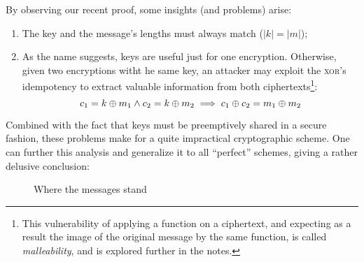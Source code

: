 By observing our recent proof, some insights (and problems) arise:
\begin{enumerate}
    \item The key and the message's lengths must always match ($|k| = |m|$);
    \item As the name suggests, keys are useful just for one encryption. Otherwise, given two encryptions witht he same key, an attacker may exploit the \textsc{xor}'s idempotency to extract valuable information from both ciphertexts\footnote{This vulnerability of applying a function on a ciphertext, and expecting as a result the image of the original message by the same function, is called \emph{malleability}, and is explored further in the notes.}:
    \[
        c_1 = k \oplus m_1 \wedge c_2 = k \oplus m_2 \implies c_1 \oplus c_2 = m_1 \oplus m_2
    \]
    
\end{enumerate}


Combined with the fact that keys must be preemptively shared in a secure fashion, these problems make for a quite impractical cryptographic scheme. One can further this analysis and generalize it to all ``perfect'' schemes, giving a rather delusive conclusion:

\begin{figure}[h]
    \centering
    \def\firstcircle{(0,0) circle (1.5cm)}
    \def\secondcircle{(60:0) circle (0.9cm)}
    \caption{Where the messages stand}
\end{figure}

